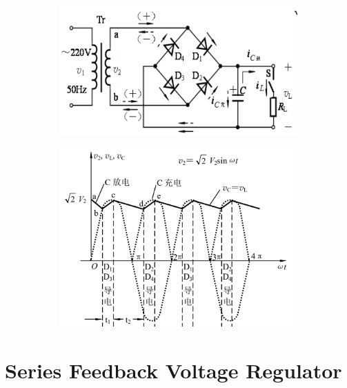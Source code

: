 \begin{figure}[H]
  \centering
  \begin{subfigure}{.5\textwidth}
    \centering
    \includegraphics[width=\linewidth]{figures/Filter-1}
  \end{subfigure}
  \begin{subfigure}{.45\textwidth}
    \centering
    \includegraphics[width=\linewidth]{figures/Filter-2}
  \end{subfigure}
\end{figure}

\section{Series Feedback Voltage Regulator}

